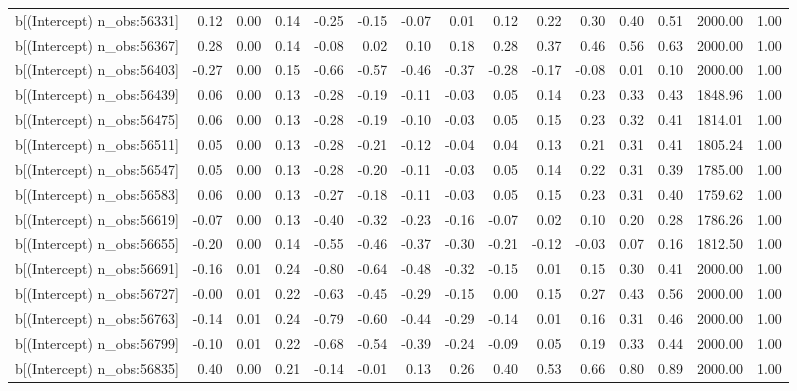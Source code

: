 \begin{table}[ht]
\begin{tabular}{rrrrrrrrrrrrrrr}
  b[(Intercept) n\_obs:56331] & 0.12 & 0.00 & 0.14 & -0.25 & -0.15 & -0.07 & 0.01 & 0.12 & 0.22 & 0.30 & 0.40 & 0.51 & 2000.00 & 1.00 \\ 
  b[(Intercept) n\_obs:56367] & 0.28 & 0.00 & 0.14 & -0.08 & 0.02 & 0.10 & 0.18 & 0.28 & 0.37 & 0.46 & 0.56 & 0.63 & 2000.00 & 1.00 \\ 
  b[(Intercept) n\_obs:56403] & -0.27 & 0.00 & 0.15 & -0.66 & -0.57 & -0.46 & -0.37 & -0.28 & -0.17 & -0.08 & 0.01 & 0.10 & 2000.00 & 1.00 \\ 
  b[(Intercept) n\_obs:56439] & 0.06 & 0.00 & 0.13 & -0.28 & -0.19 & -0.11 & -0.03 & 0.05 & 0.14 & 0.23 & 0.33 & 0.43 & 1848.96 & 1.00 \\ 
  b[(Intercept) n\_obs:56475] & 0.06 & 0.00 & 0.13 & -0.28 & -0.19 & -0.10 & -0.03 & 0.05 & 0.15 & 0.23 & 0.32 & 0.41 & 1814.01 & 1.00 \\ 
  b[(Intercept) n\_obs:56511] & 0.05 & 0.00 & 0.13 & -0.28 & -0.21 & -0.12 & -0.04 & 0.04 & 0.13 & 0.21 & 0.31 & 0.41 & 1805.24 & 1.00 \\ 
  b[(Intercept) n\_obs:56547] & 0.05 & 0.00 & 0.13 & -0.28 & -0.20 & -0.11 & -0.03 & 0.05 & 0.14 & 0.22 & 0.31 & 0.39 & 1785.00 & 1.00 \\ 
  b[(Intercept) n\_obs:56583] & 0.06 & 0.00 & 0.13 & -0.27 & -0.18 & -0.11 & -0.03 & 0.05 & 0.15 & 0.23 & 0.31 & 0.40 & 1759.62 & 1.00 \\ 
  b[(Intercept) n\_obs:56619] & -0.07 & 0.00 & 0.13 & -0.40 & -0.32 & -0.23 & -0.16 & -0.07 & 0.02 & 0.10 & 0.20 & 0.28 & 1786.26 & 1.00 \\ 
  b[(Intercept) n\_obs:56655] & -0.20 & 0.00 & 0.14 & -0.55 & -0.46 & -0.37 & -0.30 & -0.21 & -0.12 & -0.03 & 0.07 & 0.16 & 1812.50 & 1.00 \\ 
  b[(Intercept) n\_obs:56691] & -0.16 & 0.01 & 0.24 & -0.80 & -0.64 & -0.48 & -0.32 & -0.15 & 0.01 & 0.15 & 0.30 & 0.41 & 2000.00 & 1.00 \\ 
  b[(Intercept) n\_obs:56727] & -0.00 & 0.01 & 0.22 & -0.63 & -0.45 & -0.29 & -0.15 & 0.00 & 0.15 & 0.27 & 0.43 & 0.56 & 2000.00 & 1.00 \\ 
  b[(Intercept) n\_obs:56763] & -0.14 & 0.01 & 0.24 & -0.79 & -0.60 & -0.44 & -0.29 & -0.14 & 0.01 & 0.16 & 0.31 & 0.46 & 2000.00 & 1.00 \\ 
  b[(Intercept) n\_obs:56799] & -0.10 & 0.01 & 0.22 & -0.68 & -0.54 & -0.39 & -0.24 & -0.09 & 0.05 & 0.19 & 0.33 & 0.44 & 2000.00 & 1.00 \\ 
  b[(Intercept) n\_obs:56835] & 0.40 & 0.00 & 0.21 & -0.14 & -0.01 & 0.13 & 0.26 & 0.40 & 0.53 & 0.66 & 0.80 & 0.89 & 2000.00 & 1.00 \\ 

\end{tabular}
\end{table}
